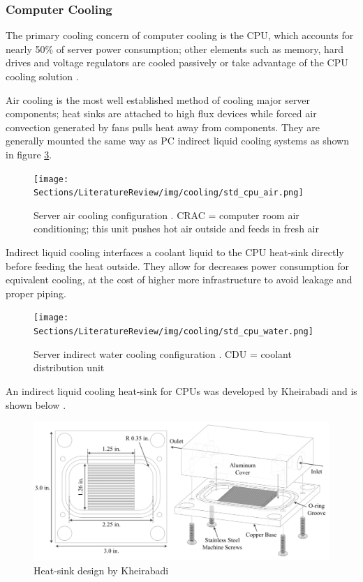 \subsubsection{Computer Cooling}

The primary cooling concern of computer cooling is the CPU, which accounts for nearly 50\% of server power consumption; other elements such as memory, hard drives and voltage regulators are cooled passively or take advantage of the CPU cooling solution \cite{kheirabadi_cooling_2016}.

Air cooling is the most well established method of cooling major server components; heat sinks are attached to high flux devices while forced air convection generated by fans pulls heat away from components.
They are generally mounted the same way as PC indirect liquid cooling systems as shown in figure \ref{fig:cooling_cpu_water_experimental}.

\begin{figure}[H]
    \centering
    \texttt{[image: Sections/LiteratureReview/img/cooling/std\_cpu\_air.png]}
    \caption{Server air cooling configuration \cite{kheirabadi_cooling_2016}. CRAC = computer room air conditioning; this unit pushes hot air outside and feeds in fresh air}
    \label{fig:cooling_cpu_air}
\end{figure}

Indirect liquid cooling interfaces a coolant liquid to the CPU heat-sink directly before feeding the heat outside.
They allow for decreases power consumption for equivalent cooling, at the cost of higher more infrastructure to avoid leakage and proper piping.

\begin{figure}[H]
    \centering
    \texttt{[image: Sections/LiteratureReview/img/cooling/std\_cpu\_water.png]}
    \caption{Server indirect water cooling configuration \cite{kheirabadi_cooling_2016}. CDU = coolant distribution unit}
    \label{fig:cooling_cpu_water}
\end{figure}

An indirect liquid cooling heat-sink for CPUs was developed by Kheirabadi and is shown below \cite{cherom_kheirabadi_experimental_2017}.

\begin{figure}[H]
    \centering
    \includegraphics[width=\textwidth]{Sections/LiteratureReview/img/cooling/std_cpu_water_schematics.png}
    \caption{Heat-sink design by Kheirabadi \cite{cherom_kheirabadi_experimental_2017}}
    \label{fig:cooling_cpu_water_experimental}
\end{figure}

